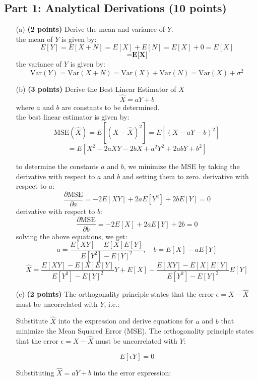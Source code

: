 \documentclass{article}
\begin{document}
\subsection*{Part 1: Analytical Derivations (10 points)}
\begin{enumerate}
    \item[(a)] \textbf{(2 points)} Derive the mean and variance of \(Y\).
    \\ the mean of \(Y\) is given by:
    \[
    E[Y] = E[X + N] = E[X] + E[N] = E[X] + 0 = E[X]
    \]
    \[
     = \textbf{E[X]}
    \]
    the variance of \(Y\) is given by:
    \[
    \text{Var}(Y) = \text{Var}(X + N) = \text{Var}(X) + \text{Var}(N) = \text{Var}(X) + \sigma^2
    \]
    \item[(b)] \textbf{(3 points)} Derive the Best Linear Estimator of \( X \)
    \[
    \hat{X} = aY + b
    \]
    where \( a \) and \( b \) are constants to be determined.
    \\ the best linear estimator is given by:
    \[
    \text{MSE}(\hat{X}) = E[(X - \hat{X})^2] = E[(X - aY - b)^2] 
    \]
    \[
    = E[X^2 - 2aXY - 2bX + a^2Y^2 + 2abY + b^2]
    \]
    
    to determine the constants \( a \) and \( b \), we minimize the MSE by taking the derivative with respect to \( a \) and \( b \) and setting them to zero.
    derivative with respect to \( a \):
    \[
    \frac{\partial \text{MSE}}{\partial a} = -2E[XY] + 2aE[Y^2] + 2bE[Y] = 0
    \]
    derivative with respect to \( b \):
    \[
    \frac{\partial \text{MSE}}{\partial b} = -2E[X] + 2aE[Y] + 2b = 0
    \]
    solving the above equations, we get:
    \[
    a = \frac{E[XY] - E[X]E[Y]}{E[Y^2] - E[Y]^2}, \quad b = E[X] - aE[Y]
    \]
    \[
    \hat{X} = \frac{E[XY] - E[X]E[Y]}{E[Y^2] - E[Y]^2}Y + E[X] - \frac{E[XY] - E[X]E[Y]}{E[Y^2] - E[Y]^2}E[Y]
    \]

    
    \item[(c)] \textbf{(2 points)} The orthogonality principle states that the error \( \epsilon = X - \hat{X} \) must be uncorrelated with \( Y \), i.e.:
    
    Substitute \( \hat{X} \) into the expression and derive equations for \( a \) and \( b \) that minimize the Mean Squared Error (MSE).
    The orthogonality principle states that the error $\epsilon = X - \hat{X}$ must be uncorrelated with $Y$:

    \[E[\epsilon Y] = 0\]
    
    Substituting $\hat{X} = aY + b$ into the error expression:
    

\end{enumerate}
\end{document}
